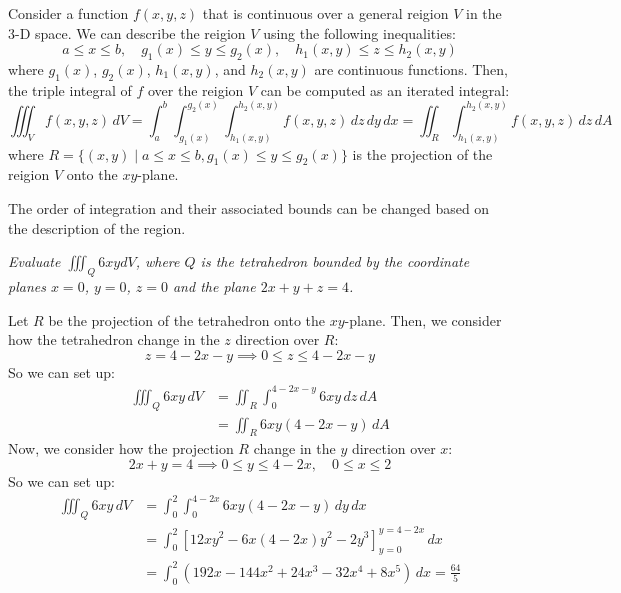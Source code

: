 \documentclass[11pt]{report}
\begin{document}
\begin{definition}
    Consider a function $f(x,y,z)$ that is continuous over a general reigion $V$ in the 3-D space. We can describe the reigion $V$ using the following inequalities:
    $$
        a \le x \le b, \quad g_1(x) \le y \le g_2(x), \quad h_1(x,y) \le z \le h_2(x,y)
    $$
    where $g_1(x)$, $g_2(x)$, $h_1(x,y)$, and $h_2(x,y)$ are continuous functions. Then, the triple integral of $f$ over the reigion $V$ can be computed as an iterated integral:
    \begin{equation}
        \iiint_V f(x,y,z) \, dV = \int_a^b \int_{g_1(x)}^{g_2(x)} \int_{h_1(x,y)}^{h_2(x,y)} f(x,y,z) \, dz \, dy \, dx = \iint_R \int_{h_1(x,y)}^{h_2(x,y)} f(x,y,z) \, dz \, dA
    \end{equation}
    where $R = \{(x,y) \mid a \le x \le b, g_1(x) \le y \le g_2(x)\}$ is the projection of the reigion $V$ onto the $xy$-plane.

    The order of integration and their associated bounds can be changed based on the description of the region.
\end{definition}

\begin{example} \label{ex:triple_integral_tetrahedron}
    \textit{Evaluate $\iiint_Q 6xy dV$, where $Q$ is the tetrahedron bounded by the coordinate planes $x=0$, $y=0$, $z=0$ and the plane $2x + y + z = 4$.}

    Let $R$ be the projection of the tetrahedron onto the $xy$-plane. Then, we consider how the tetrahedron change in the $z$ direction over $R$:
    $$
        z = 4 - 2x - y \implies 0 \le z \le 4 - 2x - y
    $$
    So we can set up:
    \begin{align*}
        \iiint_Q 6xy \, dV &= \iint_R \int_0^{4 - 2x - y} 6xy \, dz \, dA \\
        &= \iint_R 6xy(4 - 2x - y) \, dA
    \end{align*}
    Now, we consider how the projection $R$ change in the $y$ direction over $x$:
    $$
        2x + y = 4 \implies 0 \le y \le 4 - 2x, \quad 0 \le x \le 2
    $$
    So we can set up:
    \begin{align*}
        \iiint_Q 6xy \, dV &= \int_0^2 \int_0^{4 - 2x} 6xy(4 - 2x - y) \, dy \, dx \\
        &= \int_0^2 \left[ 12x y^2 - 6x(4 - 2x) y^2 - 2y^3 \right]_{y=0}^{y=4 - 2x} \, dx \\
        &= \int_0^2 (192x - 144x^2 + 24x^3 - 32x^4 + 8x^5) \, dx = \frac{64}{5}
    \end{align*}
\end{example}
\end{document}
